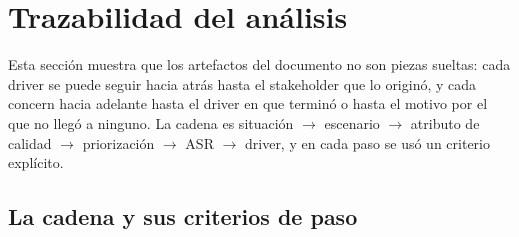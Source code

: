 \section{Trazabilidad del análisis}\label{sec:trazabilidad}

Esta sección muestra que los artefactos del documento no son piezas sueltas: cada driver se puede seguir hacia atrás hasta el stakeholder que lo originó, y cada concern hacia adelante hasta el driver en que terminó o hasta el motivo por el que no llegó a ninguno. La cadena es situación $\rightarrow$ escenario $\rightarrow$ atributo de calidad $\rightarrow$ priorización $\rightarrow$ ASR $\rightarrow$ driver, y en cada paso se usó un criterio explícito.

\subsection{La cadena y sus criterios de paso}

